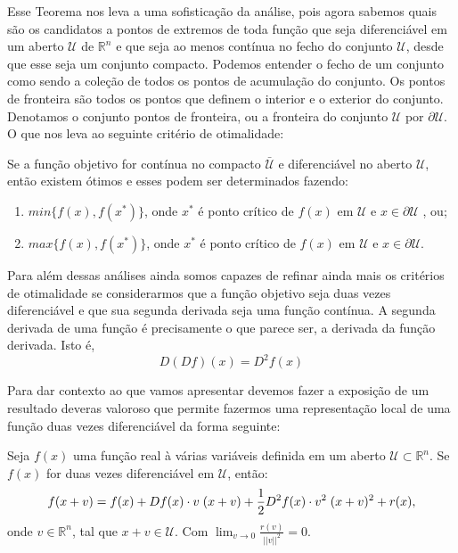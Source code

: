 \par Esse Teorema nos leva a uma sofisticação da análise, pois agora sabemos quais são os candidatos a pontos de extremos de toda função que seja diferenciável em um aberto $\mathcal{U}$ de $\mathbb{R}^n$ e que seja ao menos contínua no fecho do conjunto $\mathcal{U}$, desde que esse seja um conjunto compacto. Podemos entender o fecho de um conjunto como sendo a coleção de todos os pontos de acumulação do conjunto. Os pontos de fronteira são todos os pontos que definem o interior e o exterior do conjunto. Denotamos o conjunto pontos de fronteira, ou a fronteira do conjunto $\mathcal{U}$ por $\partial \mathcal{U}$. O que nos leva ao seguinte critério de otimalidade:

\begin{theorem}
  Se a função objetivo for contínua no compacto $\mathcal{\bar{U}}$ e diferenciável no aberto $\mathcal{U}$, então existem ótimos e esses podem ser determinados fazendo:
  \begin{enumerate}
  \item $min\{f(x), f(x^{*})\}$, onde $x^{*}$ é ponto crítico de $f(x)$ em $\mathcal{U}$ e $x \in \partial \mathcal{U}$ , ou;
  \item $max\{f(x), f(x^{*})\}$, onde $x^{*}$ é ponto crítico de $f(x)$ em $\mathcal{U}$ e $x \in \partial \mathcal{U}$.
  \end{enumerate}
\end{theorem}

\par Para além dessas análises ainda somos capazes de refinar ainda mais os critérios de otimalidade se considerarmos que a função objetivo seja duas vezes diferenciável e que sua segunda derivada seja uma função contínua. A segunda derivada de uma função é precisamente o que parece ser, a derivada da função derivada. Isto é,
\begin{equation}
  D(Df)(x) = D^{2}f(x)
\end{equation}

\par Para dar contexto ao que vamos apresentar devemos fazer a exposição de um resultado deveras valoroso que permite fazermos uma representação local de uma função duas vezes diferenciável da forma seguinte:

\begin{theorem}
  Seja $f(x)$ uma função real à várias variáveis definida em um aberto $\mathcal{U} \subset \mathbb{R}^n$. Se $f(x)$ for duas vezes diferenciável em $\mathcal{U}$, então:
  \begin{equation}
    f(x+v) = f(x)+ Df(x) \cdot v  \hspace{0.1cm} (x+v) + \frac{1}{2} D^2f(x) \cdot v^2 \hspace{0.1cm} (x+v)^2 + r(x),
  \end{equation}
  onde $v \in \mathbb{R}^n$, tal que $x+v \in \mathcal{U}$. Com $\lim_{v \rightarrow 0}\frac{r(v)}{||v||^2} = 0$.
\end{theorem}

